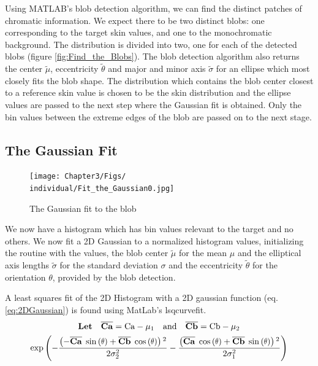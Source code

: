 Using MATLAB's blob detection algorithm, we can find the distinct patches of chromatic information. We expect there to be two distinct blobs: one corresponding to the target skin values, and one to the monochromatic background. The distribution is divided into two, one for each of the detected blobs (figure \ref{fig:Find_the_Blobs}). The blob detection algorithm also returns the center $\widetilde{\mu}$, eccentricity $\widetilde{\theta}$ and major and minor axis $\widetilde{\sigma}$ for an ellipse which most closely fits the blob shape. The distribution which contains the blob center closest to a reference skin value is chosen to be the skin distribution and the ellipse values are passed to the next step where the Gaussian fit is obtained. Only the bin values between the extreme edges of the blob are passed on to the next stage.

\subsection{The Gaussian Fit}\label{sec:TheGaussianFit}

\begin{figure}[h!] %
  \centering
    \texttt{[image: Chapter3/Figs/\\individual/Fit\_the\_Gaussian0.jpg]}
        \caption{The Gaussian fit to the blob}  \label{fig:Fit_the_Gaussian0}
    \end{figure}


We now have a histogram which has bin values relevant to the target and no others. We now fit a 2D Gaussian to a normalized histogram values, initializing the routine with the values, the blob center $\widetilde{\mu}$ for the mean $\mu$ and the  elliptical axis lengths $\widetilde{\sigma}$ for the standard deviation $\sigma$  and the eccentricity $\widetilde{\theta}$  for the orientation $\theta$, provided by the blob detection.

A least squares fit of the 2D Histogram with a 2D gaussian function (eq. \ref{eq:2DGaussian})  is found using MatLab's lsqcurvefit.
\newcommand{\CaMu}{ \overline{\mathbf{Ca}} }
\newcommand{\CbMu}{\overline{\mathbf{Cb}}  }
\begin{gather}\label{eq:2DGaussian}
\textbf{Let} \quad \CaMu = \text{Ca}-\mu_1 \quad \text{and} \quad \CbMu = \text{Cb}-\mu_2 \\
\exp \left(
-\frac{\left( - \CaMu \; \sine{     \theta } + \CbMu \; \cosine{ \theta } \right){}^2}{2 \sigma_2^2} - 
\frac{\left(      \CaMu \; \cosine{ \theta } + \CbMu \; \sine{      \theta} \right){}^2}{2 \sigma_1^2} \right)
\end{gather}



